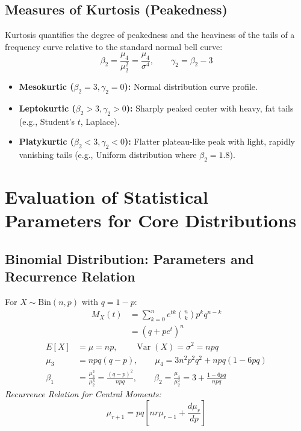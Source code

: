 \documentclass[12pt,a4paper]{article}
\begin{document}
\subsection{Measures of Kurtosis (Peakedness)}
\begin{tcolorbox}[defbox, title={\textbf{Definition: Kurtosis Coefficients $\beta_2$ and $\gamma_2$}}]
Kurtosis quantifies the degree of peakedness and the heaviness of the tails of a frequency curve relative to the standard normal bell curve:
\begin{equation}
  \beta_2 = \frac{\mu_4}{\mu_2^2} = \frac{\mu_4}{\sigma^4}, \qquad \gamma_2 = \beta_2 - 3
\end{equation}
\begin{itemize}[leftmargin=*, itemsep=2pt]
  \item \textbf{Mesokurtic ($\beta_2 = 3, \gamma_2 = 0$):} Normal distribution curve profile.
  \item \textbf{Leptokurtic ($\beta_2 > 3, \gamma_2 > 0$):} Sharply peaked center with heavy, fat tails (e.g., Student's $t$, Laplace).
  \item \textbf{Platykurtic ($\beta_2 < 3, \gamma_2 < 0$):} Flatter plateau-like peak with light, rapidly vanishing tails (e.g., Uniform distribution where $\beta_2 = 1.8$).
\end{itemize}
\end{tcolorbox}

\section{Evaluation of Statistical Parameters for Core Distributions}

\subsection{Binomial Distribution: Parameters and Recurrence Relation}
For $X \sim \text{Bin}(n, p)$ with $q = 1-p$:
\begin{equation}
  \begin{aligned}
    M_X(t) &= \sum_{k=0}^n e^{tk} \binom{n}{k} p^k q^{n-k} \\[3pt]
    &= (q + p e^t)^n
  \end{aligned}
\end{equation}
\begin{align}
  E[X] &= \mu = np, \qquad \operatorname{Var}(X) = \sigma^2 = npq \\[3pt]
  \mu_3 &= npq(q - p), \qquad \mu_4 = 3n^2 p^2 q^2 + npq(1 - 6pq) \\[3pt]
  \beta_1 &= \frac{\mu_3^2}{\mu_2^3} = \frac{(q-p)^2}{npq}, \qquad \beta_2 = \frac{\mu_4}{\mu_2^2} = 3 + \frac{1 - 6pq}{npq}
\end{align}
\textit{Recurrence Relation for Central Moments:}
\begin{equation}
  \mu_{r+1} = pq \left[n r \mu_{r-1} + \frac{d\mu_r}{dp}\right]
\end{equation}
\end{document}
